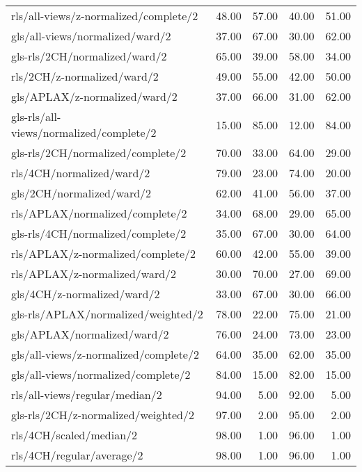 \begin{longtable}{lrrrr}
    rls/all-views/z-normalized/complete/2     & 48.00 & 57.00 & 40.00 & 51.00 \\
    gls/all-views/normalized/ward/2           & 37.00 & 67.00 & 30.00 & 62.00 \\
    gls-rls/2CH/normalized/ward/2             & 65.00 & 39.00 & 58.00 & 34.00 \\
    rls/2CH/z-normalized/ward/2               & 49.00 & 55.00 & 42.00 & 50.00 \\
    gls/APLAX/z-normalized/ward/2             & 37.00 & 66.00 & 31.00 & 62.00 \\
    gls-rls/all-views/normalized/complete/2   & 15.00 & 85.00 & 12.00 & 84.00 \\
    gls-rls/2CH/normalized/complete/2         & 70.00 & 33.00 & 64.00 & 29.00 \\
    rls/4CH/normalized/ward/2                 & 79.00 & 23.00 & 74.00 & 20.00 \\
    gls/2CH/normalized/ward/2                 & 62.00 & 41.00 & 56.00 & 37.00 \\
    rls/APLAX/normalized/complete/2           & 34.00 & 68.00 & 29.00 & 65.00 \\
    gls-rls/4CH/normalized/complete/2         & 35.00 & 67.00 & 30.00 & 64.00 \\
    rls/APLAX/z-normalized/complete/2         & 60.00 & 42.00 & 55.00 & 39.00 \\
    rls/APLAX/z-normalized/ward/2             & 30.00 & 70.00 & 27.00 & 69.00 \\
    gls/4CH/z-normalized/ward/2               & 33.00 & 67.00 & 30.00 & 66.00 \\
    gls-rls/APLAX/normalized/weighted/2       & 78.00 & 22.00 & 75.00 & 21.00 \\
    gls/APLAX/normalized/ward/2               & 76.00 & 24.00 & 73.00 & 23.00 \\
    gls/all-views/z-normalized/complete/2     & 64.00 & 35.00 & 62.00 & 35.00 \\
    gls/all-views/normalized/complete/2       & 84.00 & 15.00 & 82.00 & 15.00 \\
    rls/all-views/regular/median/2            & 94.00 &  5.00 & 92.00 &  5.00 \\
    gls-rls/2CH/z-normalized/weighted/2       & 97.00 &  2.00 & 95.00 &  2.00 \\
    rls/4CH/scaled/median/2                   & 98.00 &  1.00 & 96.00 &  1.00 \\
    rls/4CH/regular/average/2                 & 98.00 &  1.00 & 96.00 &  1.00 \\

\end{longtable}
